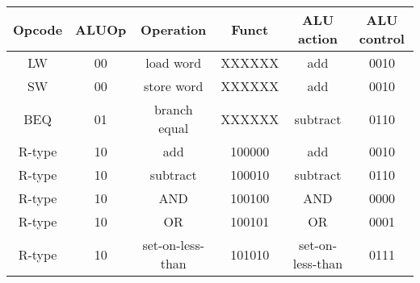 \begin{tabular}[t]{cccccc}
    \toprule
    Opcode & ALUOp       & Operation        & Funct           & ALU action       & ALU control   \\
    \midrule
    LW     & {00} & load word        & {XXXXXX} & add              & {0010} \\
    SW     & {00} & store word       & {XXXXXX} & add              & {0010} \\
    BEQ    & {01} & branch equal     & {XXXXXX} & subtract         & {0110} \\
    R-type & {10} & add              & {100000} & add              & {0010} \\
    R-type & {10} & subtract         & {100010} & subtract         & {0110} \\
    R-type & {10} & AND              & {100100} & AND              & {0000} \\
    R-type & {10} & OR               & {100101} & OR               & {0001} \\
    R-type & {10} & set-on-less-than & {101010} & set-on-less-than & {0111} \\
    \bottomrule
\end{tabular}
